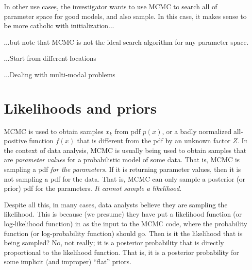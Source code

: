 \documentclass[12pt,twoside,pdftex]{article}
\begin{document}
In other use cases,
  the investigator wants to use MCMC to search all of parameter space
  for good models, and also sample.
In this case, it makes sense to be more catholic with initialization...

...but note that MCMC is not the ideal search algorithm for any parameter space.

...Start from different locations

...Dealing with multi-modal problems

\section{Likelihoods and priors}

MCMC is used to obtain samples $x_k$ from pdf $p(x)$,
  or a badly normalized all-positive function $f(x)$
  that is different from the pdf by an unknown factor $Z$.
In the context of data analysis,
  MCMC is usually being used to obtain samples
  that are \emph{parameter values} for a probabilistic model of some data.
That is, MCMC is sampling a pdf \emph{for the parameters}.
If it is returning parameter values, then it is not sampling a pdf for the data.
That is, MCMC can only sample a posterior (or prior) pdf for the parameters.
\emph{It cannot sample a likelihood.}%

Despite all this, in many cases,
  data analysts believe they are sampling the likelihood.
This is because (we presume) they have put a likelihood function
  (or log-likelihood function)
  in as the input to the MCMC code, where the probability function
  (or log-probability function) should go.
Then is it the likelihood that is being sampled?
No, not really;
  it is a posterior probability that is directly proportional to the likelihood function.
That is, it is a posterior probability for some implicit (and improper) ``flat'' priors.
\end{document}
